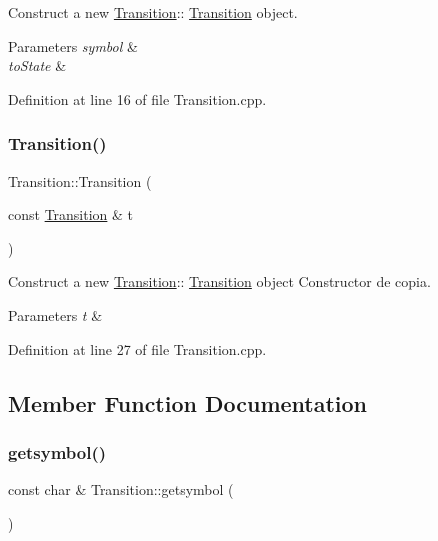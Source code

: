 Construct a new \hyperlink{class_transition}{Transition}\+:\+: \hyperlink{class_transition}{Transition} object. 


\begin{DoxyParams}{Parameters}
{\em symbol} & \\
\hline
{\em to\+State} & \\
\hline
\end{DoxyParams}


Definition at line 16 of file Transition.\+cpp.

\mbox{\label{class_transition_a3a95a02ec9471b3af89c3f1b947048fc}} 
\subsubsection{\texorpdfstring{Transition()}{Transition()}\hspace{0.1cm}{\footnotesize\ttfamily [3/3]}}
{\footnotesize\ttfamily Transition\+::\+Transition (\begin{DoxyParamCaption}\item[{const \hyperlink{class_transition}{Transition} \&}]{t }\end{DoxyParamCaption})}



Construct a new \hyperlink{class_transition}{Transition}\+:\+: \hyperlink{class_transition}{Transition} object Constructor de copia. 


\begin{DoxyParams}{Parameters}
{\em t} & \\
\hline
\end{DoxyParams}


Definition at line 27 of file Transition.\+cpp.



\subsection{Member Function Documentation}
\mbox{\label{class_transition_a369a807fa22249a5eea8ace9d8fc10ce}} 
\subsubsection{\texorpdfstring{getsymbol()}{getsymbol()}}
{\footnotesize\ttfamily const char \& Transition\+::getsymbol (\begin{DoxyParamCaption}{ }\end{DoxyParamCaption})}



